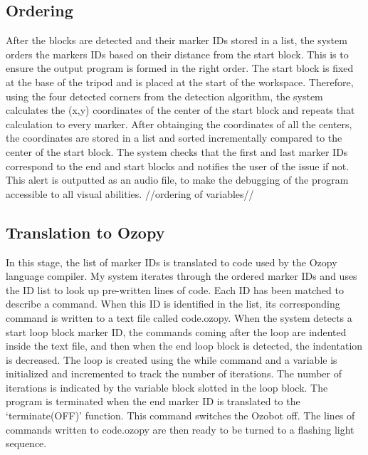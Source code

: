 \documentclass[oneside,%
                    author={Malak Hajji},
                    degree={BSc},
                    title={Designing An Accessible Computational Toolkit For Students},
                  subtitle={With Mixed Visual Abilities}]{dissertation}
\begin{document}
\subsection{Ordering} 
 
After the blocks are detected and their marker IDs stored in a list, the system orders the markers IDs based on their distance from the start block. This is to ensure the output program is formed in the right order. The start block is fixed at the base of the tripod and is placed at the start of the workspace. Therefore, using the four detected corners from the detection algorithm, the system calculates the (x,y) coordinates of the center of the start block and repeats that calculation to every marker. After obtainging the coordinates of all the centers, the coordinates are stored in a list and sorted incrementally compared to the center of the start block. 
The system checks that the first and last marker IDs correspond to the end and start blocks and notifies the user of the issue if not. This alert is outputted as an audio file, to make the debugging of the program accessible to all visual abilities.  
//ordering of variables// 
 
\subsection{Translation to Ozopy}
 
In this stage, the list of marker IDs is translated to code used by the Ozopy language compiler. My system iterates through the ordered marker IDs and uses the ID list to look up pre-written lines of code. Each ID has been matched to describe a command. When this ID is identified in the list, its corresponding command is written to a text file called code.ozopy.  
When the system detects a start loop block marker ID, the commands coming after the loop are indented inside the text file, and then when the end loop block is detected, the indentation is decreased. The loop is created using the while command and a variable is initialized and incremented to track the number of iterations. The number of iterations is indicated by the variable block slotted in the loop block. The program is terminated when the end marker ID is translated to the ‘terminate(OFF)’ function. This command switches the Ozobot off. 
The lines of commands written to code.ozopy are then ready to be turned to a flashing light sequence. 
 
 
\end{document}
